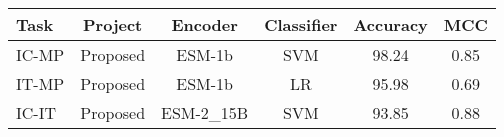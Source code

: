 \begin{tabular}{lccccc}
\toprule
 \textbf{Task} &  \textbf{Project} &   \textbf{Encoder} & \textbf{Classifier} &  \textbf{Accuracy} &  \textbf{MCC} \\
\midrule
IC-MP & Proposed &    ESM-1b &        SVM &     98.24 & 0.85 \\
IT-MP & Proposed &    ESM-1b &         LR &     95.98 & 0.69 \\
IC-IT & Proposed & ESM-2\_15B &        SVM &     93.85 & 0.88 \\
\bottomrule
\end{tabular}
